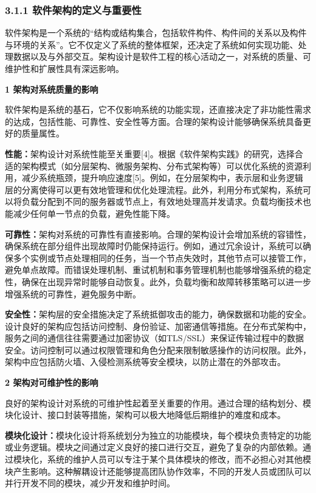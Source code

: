 \subsubsection{3.1.1 软件架构的定义与重要性}\label{ux8f6fux4ef6ux67b6ux6784ux7684ux5b9aux4e49ux4e0eux91cdux8981ux6027-1}

软件架构是一个系统的``结构或结构集合，包括软件构件、构件间的关系以及构件与环境的关系''。它不仅定义了系统的整体框架，还决定了系统如何实现功能、处理数据以及与外部交互。架构设计是软件工程的核心活动之一，对系统的质量、可维护性和扩展性具有深远影响。

\textbf{1 架构对系统质量的影响}

软件架构是系统的基石，它不仅影响系统的功能实现，还直接决定了非功能性需求的达成，包括性能、可靠性、安全性等方面。合理的架构设计能够确保系统具备更好的质量属性。

\textbf{性能：}架构设计对系统性能至关重要{[}4{]}。根据《软件架构实践》的研究，选择合适的架构模式（如分层架构、微服务架构、分布式架构等）可以优化系统的资源利用，减少系统瓶颈，提升响应速度{[}5{]}。例如，在分层架构中，表示层和业务逻辑层的分离使得可以更有效地管理和优化处理流程。此外，利用分布式架构，系统可以将负载分配到不同的服务器或节点上，有效地处理高并发请求。负载均衡技术也能减少任何单一节点的负载，避免性能下降。

\textbf{可靠性：}架构对系统的可靠性有直接影响。合理的架构设计会增加系统的容错性，确保系统在部分组件出现故障时仍能保持运行。例如，通过冗余设计，系统可以确保多个实例或节点处理相同的任务，当一个节点失效时，其他节点可以接管工作，避免单点故障。而错误处理机制、重试机制和事务管理机制也能够增强系统的稳定性，确保在出现异常时能够自动恢复。此外，负载均衡和故障转移策略可以进一步增强系统的可靠性，避免服务中断。

\textbf{安全性：}架构层的安全措施决定了系统抵御攻击的能力，确保数据和功能的安全。设计良好的架构应包括访问控制、身份验证、加密通信等措施。在分布式架构中，服务之间的通信往往需要通过加密协议（如TLS/SSL）来保证传输过程中的数据安全。访问控制可以通过权限管理和角色分配来限制敏感操作的访问权限。此外，架构中应包括防火墙、入侵检测系统等安全模块，以防止潜在的外部攻击。

\textbf{2 架构对可维护性的影响}

良好的架构设计对系统的可维护性起着至关重要的作用。通过合理的结构划分、模块化设计、接口封装等措施，架构可以极大地降低后期维护的难度和成本。

\textbf{模块化设计：}模块化设计将系统划分为独立的功能模块，每个模块负责特定的功能或业务逻辑。模块之间通过定义良好的接口进行交互，避免了复杂的内部依赖。通过模块化，系统的维护人员可以专注于某个具体模块的修改，而不必担心对其他模块产生影响。这种解耦设计还能够提高团队协作效率，不同的开发人员或团队可以并行开发不同的模块，减少开发和维护时间。

